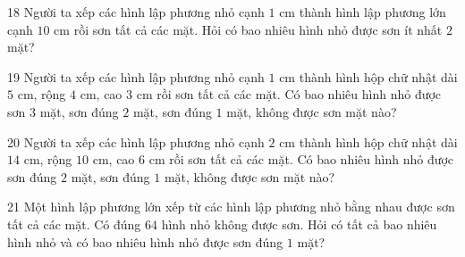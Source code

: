 \gap
\begin{probbox}{18}{\relax}
Người ta xếp các hình lập phương nhỏ cạnh $1$ cm thành hình lập phương lớn cạnh $10$ cm rồi sơn tất cả các mặt. Hỏi có bao nhiêu hình nhỏ được sơn ít nhất $2$ mặt?
\end{probbox}
\gap
\begin{probbox}{19}{\relax}
Người ta xếp các hình lập phương nhỏ cạnh $1$ cm thành hình hộp chữ nhật dài $5$ cm, rộng $4$ cm, cao $3$ cm rồi sơn tất cả các mặt. Có bao nhiêu hình nhỏ được sơn $3$ mặt, sơn đúng $2$ mặt, sơn đúng $1$ mặt, không được sơn mặt nào?
\end{probbox}
\gap
\begin{probbox}{20}{\relax}
Người ta xếp các hình lập phương nhỏ cạnh $2$ cm thành hình hộp chữ nhật dài $14$ cm, rộng $10$ cm, cao $6$ cm rồi sơn tất cả các mặt. Có bao nhiêu hình nhỏ được sơn đúng $2$ mặt, sơn đúng $1$ mặt, không được sơn mặt nào?
\end{probbox}
\gap
\begin{probbox}{21}{\relax}
Một hình lập phương lớn xếp từ các hình lập phương nhỏ bằng nhau được sơn tất cả các mặt. Có đúng $64$ hình nhỏ không được sơn. Hỏi có tất cả bao nhiêu hình nhỏ và có bao nhiêu hình nhỏ được sơn đúng $1$ mặt?
\end{probbox}
